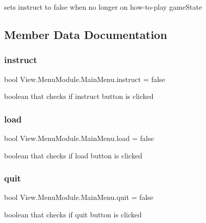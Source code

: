 sets instruct to false when no longer on how-\/to-\/play game\+State 

\subsection{Member Data Documentation}
\hypertarget{class_view_1_1_menu_module_1_1_main_menu_a514b306d7cce15ff72e2ac6be14c2b2a}{}\label{class_view_1_1_menu_module_1_1_main_menu_a514b306d7cce15ff72e2ac6be14c2b2a} 
\subsubsection{\texorpdfstring{instruct}{instruct}}
{\footnotesize\ttfamily bool View.\+Menu\+Module.\+Main\+Menu.\+instruct = false}

boolean that checks if instruct button is clicked \hypertarget{class_view_1_1_menu_module_1_1_main_menu_a7110a2e6e67e19059e16098e6d0c0760}{}\label{class_view_1_1_menu_module_1_1_main_menu_a7110a2e6e67e19059e16098e6d0c0760} 
\subsubsection{\texorpdfstring{load}{load}}
{\footnotesize\ttfamily bool View.\+Menu\+Module.\+Main\+Menu.\+load = false}

boolean that checks if load button is clicked \hypertarget{class_view_1_1_menu_module_1_1_main_menu_addcf92427de2068836c36b3c5de5d28d}{}\label{class_view_1_1_menu_module_1_1_main_menu_addcf92427de2068836c36b3c5de5d28d} 
\subsubsection{\texorpdfstring{quit}{quit}}
{\footnotesize\ttfamily bool View.\+Menu\+Module.\+Main\+Menu.\+quit = false}

boolean that checks if quit button is clicked \hypertarget{class_view_1_1_menu_module_1_1_main_menu_ac97190789e671d423f613617b1ad2480}{}\label{class_view_1_1_menu_module_1_1_main_menu_ac97190789e671d423f613617b1ad2480} 
